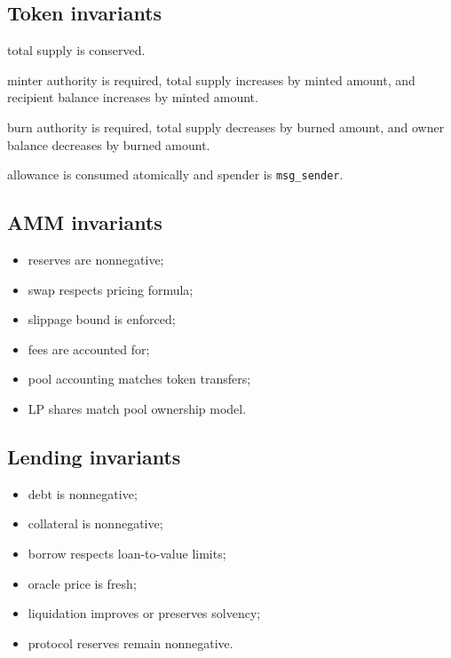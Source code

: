 \documentclass[11pt]{article}
\newcommand{\code}[1]{\texttt{#1}}
\begin{document}
\subsection{Token invariants}

\begin{description}[leftmargin=2.8cm]
  \item[Transfer] total supply is conserved.
  \item[Mint] minter authority is required, total supply increases by minted amount, and recipient balance increases by minted amount.
  \item[Burn] burn authority is required, total supply decreases by burned amount, and owner balance decreases by burned amount.
  \item[transferFrom] allowance is consumed atomically and spender is \code{msg\_sender}.
\end{description}

\subsection{AMM invariants}

\begin{itemize}
  \item reserves are nonnegative;
  \item swap respects pricing formula;
  \item slippage bound is enforced;
  \item fees are accounted for;
  \item pool accounting matches token transfers;
  \item LP shares match pool ownership model.
\end{itemize}

\subsection{Lending invariants}

\begin{itemize}
  \item debt is nonnegative;
  \item collateral is nonnegative;
  \item borrow respects loan-to-value limits;
  \item oracle price is fresh;
  \item liquidation improves or preserves solvency;
  \item protocol reserves remain nonnegative.
\end{itemize}
\end{document}
